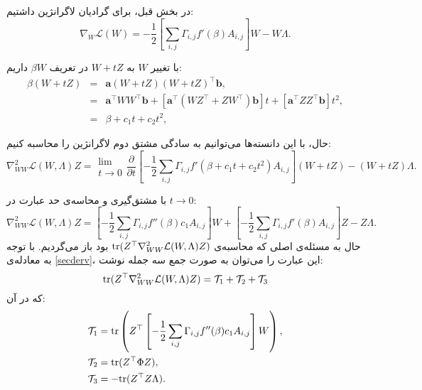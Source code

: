 در بخش قبل، برای گرادیان لاگرانژین داشتیم:
\begin{equation}
\nabla_W \mathcal{L} ( W) = -\frac{1}{2}\left[ \sum_{i, j} \Gamma_{i, j} f' ( \beta)
A_{i, j} \right] W - W \Lambda .
\end{equation}

با تغییر 
$W$
به 
$W + tZ$
در تعریف 
$\beta{W}$
داریم:
\begin{equation}
\begin{array}{lll}
\beta ( W + t Z) & = & \mathbf{a} ( W + t Z) ( W + t Z)^\top 
\mathbf{b},\\
& = & \mathbf{a}^\top  W W^\top  \mathbf{b}+ [ \mathbf{a}^\top  ( W Z^\top  + Z
W^\top ) \mathbf{b}] t + [ \mathbf{a}^\top  Z Z^\top  \mathbf{b}] t^2,\\
& = & \beta + c_1 t + c_2 t^2,
\label{eq:beta}
\end{array}
\end{equation}

حال، با این دانسته‌ها می‌توانیم به سادگی مشتق دوم لاگرانژین را محاسبه کنیم:
\small
\begin{equation}
\nabla^2_{W W} \mathcal{L} ( W, \Lambda) Z = \begin{array}{l}
\lim\\
t \rightarrow 0
\end{array} \frac{\partial}{\partial t} \left[-\frac{1}{2} \sum_{i, j}  \Gamma_{i, j}
f' ( \beta + c_1 t + c_2 t^2) A_{i, j} \right] ( W + t Z) - ( W + t Z)
\Lambda .
\end{equation}

\normalsize
با مشتق‌گیری و محاسه‌ی حد عبارت در 
$t \to 0$:
\small
\begin{equation}
\nabla^2_{W W} \mathcal{L} ( W, \Lambda) Z = \left[-\frac{1}{2} \sum_{i, j} \Gamma_{i,
	j} f'' ( \beta) c_1 A_{i, j} \right] W + \left[ -\frac{1}{2} \sum_{i, j} \Gamma_{i, j}
f' ( \beta) A_{i, j} \right] Z - Z \Lambda .
\label{secderv}
\end{equation}
\normalsize
حال به مسئله‌ی اصلی که محاسبه‌ی 
$\mathrm{tr}(Z^\top \nabla^2_{WW} \mathcal{L} (W, \Lambda)Z)$
بود باز می‌گردیم. با توجه به معادله‌ی 
\eqref{secderv}،
این عبارت را می‌توان به صورت جمع سه جمله نوشت:
\begin{equation}
\mathrm{tr}(Z^\top \nabla^2_{WW} \mathcal{L} (W, \Lambda)Z) = \mathcal{T}_1 + \mathcal{T}_2 + 
\mathcal{T}_3
\end{equation}
که در آن‌:
 \begin{align}
\mathcal{T}_1 & = \mathrm{tr} \left( Z^\top  \left[ -\frac{1}{2}\sum_{i, j} \Gamma_{i,
	j} f'' ( \beta) c_1 A_{i, j} \right] W \right),\\
\mathcal{T}_2 & = \mathrm{tr} ( Z^\top  \Phi Z),
\label{eq:app:T2}
\\
\mathcal{T}_3 & = - \mathrm{tr} ( Z^\top  Z \Lambda).
\label{eq:app:T3}
\end{align}

